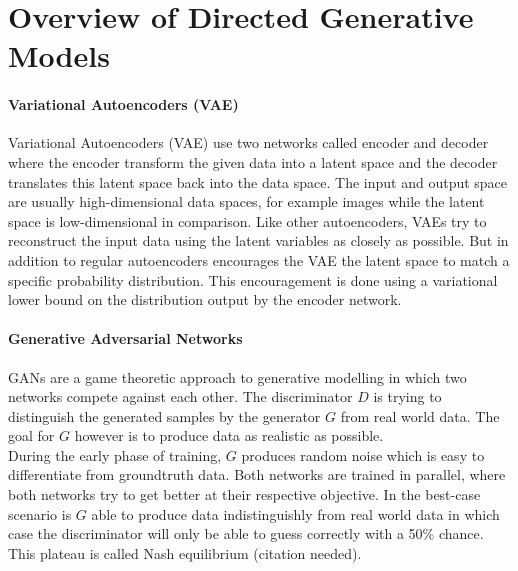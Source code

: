 \section{Overview of Directed Generative Models}
\label{sec:overview}


\paragraph{Variational Autoencoders (VAE) \cite{vae:2013}\cite{rezende:2014}}
\label{par:overview_vae}
Variational Autoencoders (VAE) use two networks called encoder and decoder where the encoder transform the given data into a latent space and the decoder translates this latent space back into the data space.
The input and output space are usually high-dimensional data spaces, for example images while the latent space is low-dimensional in comparison.
Like other autoencoders, VAEs try to reconstruct the input data using the latent variables as closely as possible.
But in addition to regular autoencoders encourages the VAE the latent space to match a specific probability distribution.
This encouragement is done using a variational lower bound on the distribution output by the encoder network.







\paragraph{Generative Adversarial Networks}
\label{par:overview_gan}
GANs are a game theoretic approach to generative modelling
in which two networks compete against each other.
The discriminator $D$ is trying to distinguish the generated samples
by the generator $G$ from real world data.
The goal for $G$ however is to produce data as realistic as possible.\\
During the early phase of training, $G$ produces random noise which
is easy to differentiate from groundtruth data.
Both networks are trained in parallel, where both networks try to get better
at their respective objective.
In the best-case scenario is $G$ able to produce data indistinguishly from real world data in which
case the discriminator will only be able to guess correctly with a 50\% chance.
This plateau is called Nash equilibrium (citation needed).




